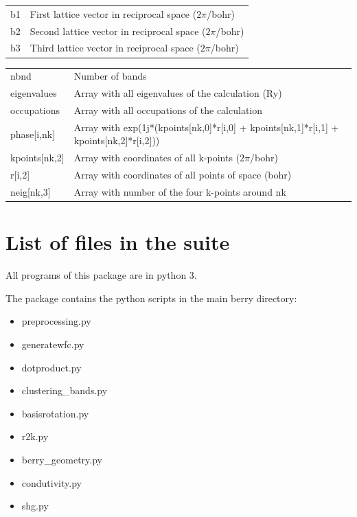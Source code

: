 \documentclass[a4paper,12pt]{report}
\begin{document}
\begin{appendices}
\begin{tabularx}{\textwidth}{Xl}
 b1             & First lattice vector in reciprocal space ($2\pi$/bohr) \\
 b2             & Second lattice vector in reciprocal space ($2\pi$/bohr) \\
 b3             & Third lattice vector in reciprocal space ($2\pi$/bohr) \\
\end{tabularx}
\vspace{0.5cm}

\hspace*{-2cm}\begin{tabularx}{\textwidth}{ll}
 nbnd           & Number of bands \\

 eigenvalues    & Array with all eigenvalues of the calculation (Ry) \\
 occupations    & Array with all occupations of the calculation \\

 phase[i,nk]    & Array with exp(1j*(kpoints[nk,0]*r[i,0] + kpoints[nk,1]*r[i,1] + kpoints[nk,2]*r[i,2])) \\
 kpoints[nk,2]  & Array with coordinates of all k-points ($2\pi$/bohr) \\
 r[i,2]         & Array with coordinates of all points of space (bohr) \\

 neig[nk,3]     & Array with number of the four k-points around nk \\
\end{tabularx}


\chapter{List of files in the suite}
 All programs of this package are in python 3.

The package contains the python scripts in the main berry directory:
\begin{itemize}
 \item preprocessing.py
 \item generatewfc.py
 \item dotproduct.py
 \item clustering\_bands.py
 \item basisrotation.py
 \item r2k.py
 \item berry\_geometry.py
 \item condutivity.py
 \item shg.py
\end{itemize}\medskip


\end{appendices}
\end{document}
